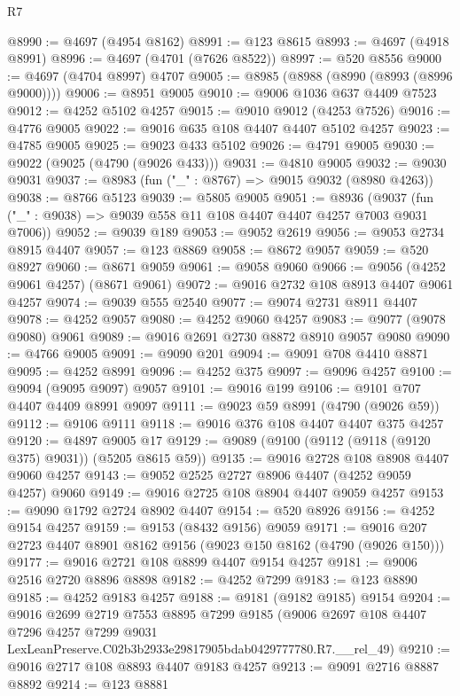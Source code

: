 \begin{lexlean}{R7}
\begin{coremodule}
@8990 := @4697 (@4954 @8162)
@8991 := @123 @8615
@8993 := @4697 (@4918 @8991)
@8996 := @4697 (@4701 (@7626 @8522))
@8997 := @520 @8556
@9000 := @4697 (@4704 @8997) @4707
@9005 := @8985 (@8988 (@8990 (@8993 (@8996 @9000))))
@9006 := @8951 @9005
@9010 := @9006 @1036 @637 @4409 @7523
@9012 := @4252 @5102 @4257
@9015 := @9010 @9012 (@4253 @7526)
@9016 := @4776 @9005
@9022 := @9016 @635 @108 @4407 @4407 @5102 @4257
@9023 := @4785 @9005
@9025 := @9023 @433 @5102
@9026 := @4791 @9005
@9030 := @9022 (@9025 (@4790 (@9026 @433)))
@9031 := @4810 @9005
@9032 := @9030 @9031
@9037 := @8983 (fun ("_" : @8767) => @9015 @9032 (@8980 @4263))
@9038 := @8766 @5123
@9039 := @5805 @9005
@9051 := @8936
    (@9037 (fun ("_" : @9038) => @9039 @558 @11 @108 @4407 @4407 @4257 @7003 @9031 @7006))
@9052 := @9039 @189
@9053 := @9052 @2619
@9056 := @9053 @2734 @8915 @4407
@9057 := @123 @8869
@9058 := @8672 @9057
@9059 := @520 @8927
@9060 := @8671 @9059
@9061 := @9058 @9060
@9066 := @9056 (@4252 @9061 @4257) (@8671 @9061)
@9072 := @9016 @2732 @108 @8913 @4407 @9061 @4257
@9074 := @9039 @555 @2540
@9077 := @9074 @2731 @8911 @4407
@9078 := @4252 @9057
@9080 := @4252 @9060 @4257
@9083 := @9077 (@9078 @9080) @9061
@9089 := @9016 @2691 @2730 @8872 @8910 @9057 @9080
@9090 := @4766 @9005
@9091 := @9090 @201
@9094 := @9091 @708 @4410 @8871
@9095 := @4252 @8991
@9096 := @4252 @375
@9097 := @9096 @4257
@9100 := @9094 (@9095 @9097) @9057
@9101 := @9016 @199
@9106 := @9101 @707 @4407 @4409 @8991 @9097
@9111 := @9023 @59 @8991 (@4790 (@9026 @59))
@9112 := @9106 @9111
@9118 := @9016 @376 @108 @4407 @4407 @375 @4257
@9120 := @4897 @9005 @17
@9129 := @9089 (@9100 (@9112 (@9118 (@9120 @375) @9031)) (@5205 @8615 @59))
@9135 := @9016 @2728 @108 @8908 @4407 @9060 @4257
@9143 := @9052 @2525 @2727 @8906 @4407 (@4252 @9059 @4257) @9060
@9149 := @9016 @2725 @108 @8904 @4407 @9059 @4257
@9153 := @9090 @1792 @2724 @8902 @4407
@9154 := @520 @8926
@9156 := @4252 @9154 @4257
@9159 := @9153 (@8432 @9156) @9059
@9171 := @9016 @207 @2723 @4407 @8901 @8162 @9156 (@9023 @150 @8162 (@4790 (@9026 @150)))
@9177 := @9016 @2721 @108 @8899 @4407 @9154 @4257
@9181 := @9006 @2516 @2720 @8896 @8898
@9182 := @4252 @7299
@9183 := @123 @8890
@9185 := @4252 @9183 @4257
@9188 := @9181 (@9182 @9185) @9154
@9204 := @9016
    @2699
    @2719
    @7553
    @8895
    @7299
    @9185
    (@9006
      @2697
      @108
      @4407
      @7296
      @4257
      @7299
      @9031
      LexLeanPreserve.C02b3b2933e29817905bdab0429777780.R7.__rel_49)
@9210 := @9016 @2717 @108 @8893 @4407 @9183 @4257
@9213 := @9091 @2716 @8887 @8892
@9214 := @123 @8881

\end{coremodule}
\end{lexlean}
